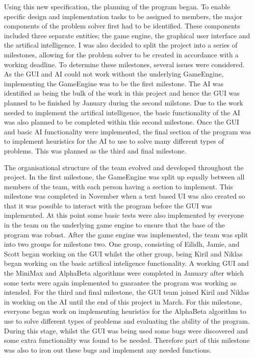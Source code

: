 \documentclass{l3proj}
\begin{document}
Using this new specification, the planning of the program began. To enable specific design and implementation tasks to be assigned to members, the major components of the problem solver first had to be identified. These components included three separate entities; the game engine, the graphical user interface and the artifical intelligence. I was also decided to split the project into a series of milestones, allowing for the problem solver to be created in accordance with a working deadline. To determine these milestones, several issues were considered. As the GUI and AI could not work without the underlying GameEngine, implementing the GameEngine was to be the first milestone. The AI was identified as being the bulk of the work in this project and hence the GUI was planned to be finished by January during the second milstone. Due to the work needed to implement the artifical intelligence, the basic functionality of the AI was also planned to be completed within this second milestone. Once the GUI and basic AI functionality were implemented, the final section of the program was to implement heuristics for the AI to use to solve many different types of problems.  This was planned as the third and final milestone.

The organisational structure of the team evolved and developed throughout the project. In the first milestone, the GameEngine was split up equally between all members of the team, with each person having a section to implement. This milestone was completed in November when a text based UI was also created so that it was possible to interact with the program before the GUI was implemented. At this point some basic tests were also implemented by everyone in the team on the underlying game engine to ensure that the base of the program was robust. After the game engine was implemented, the team was split into two groups for milestone two. One group, consisting of Eilidh, Jamie, and Scott began working on the GUI whilst the other group, being Kiril and Niklas began working on the basic artifical inteligence functionality.  A working GUI and the MiniMax and AlphaBeta algorithms were completed in January after which some tests were again implemented to guarantee the program was working as intended. For the third and final milestone, the GUI team joined Kiril and Niklas in working on the AI until the end of this project in March.  For this milestone, everyone began work on implementing heuristics for the AlphaBeta algorithm to use to solve different types of problems and evaluating the ability of the program.  During this stage, whilst the GUI was being used some bugs were discovered and some extra functionality was found to be needed.  Therefore part of this milestone was also to iron out these bugs and implement any needed functions.
\end{document}
